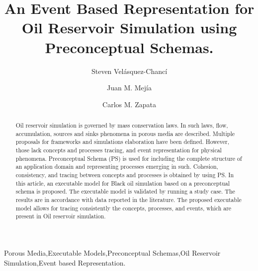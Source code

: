 \documentclass[review]{elsarticle}
\begin{document}
\begin{frontmatter}

\title{An Event Based Representation for Oil Reservoir Simulation using Preconceptual Schemas.}


\author[mymainaddress]{Steven Vel\'asquez-Chanc\'i}

\author[mysecondaryaddress1]{Juan M. Mej\'ia}
\author[mysecondaryaddress2]{ Carlos M. Zapata}

\address[mymainaddress]{National University of Colombia, Medellin. Department of Computer and Decision Science.}
\address[mysecondaryaddress1]{National University of Colombia, Medellin. Department of Processes and Energy.}
\address[mysecondaryaddress2]{National University of Colombia, Medellin. Department of Computer and Decision Science.}


\begin{abstract}
	Oil reservoir simulation is governed by mass conservation laws. In such laws, flow, accumulation, sources and sinks phenomena in porous media are described. Multiple proposals for frameworks and simulations elaboration have been defined. However, those lack concepts and processes tracing, and event representation for physical phenomena. Preconceptual Schema (PS) is used for including the complete structure of an application domain and representing processes emerging in such. Cohesion, consistency, and tracing between concepts and processes is obtained by using PS. In this article, an executable model for Black oil simulation based on a preconceptual schema is proposed. The executable model is validated by running a study case. The results are in accordance with data reported in the literature. The proposed executable model allows for tracing consistently the concepts, processes, and events, which are present in Oil reservoir simulation. 
\end{abstract}

\begin{keyword}
	Porous Media\sep Executable Models\sep Preconceptual Schemas\sep Oil Reservoir Simulation\sep Event based Representation.
\end{keyword}

\end{frontmatter}
\end{document}
